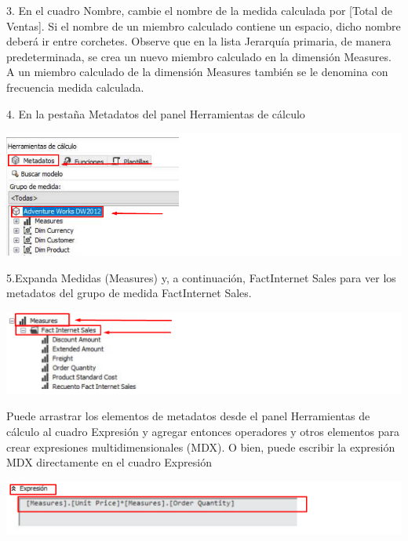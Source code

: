 3. En el cuadro Nombre, cambie el nombre de la medida calculada por [Total de Ventas].
Si el nombre de un miembro calculado contiene un espacio, dicho nombre deberá ir entre corchetes.
Observe que en la lista Jerarquía primaria, de manera predeterminada, se crea un nuevo miembro calculado en
la dimensión Measures. A un miembro calculado de la dimensión Measures también se le denomina con
frecuencia medida calculada.

4. En la pestaña Metadatos del panel Herramientas de cálculo

	\begin{center}
	\includegraphics[width=\columnwidth]{images/task7/img3}
	\end{center}	

5.Expanda Medidas (Measures) y, a continuación, FactInternet Sales para ver los metadatos del grupo de medida
FactInternet Sales.

	\begin{center}
	\includegraphics[width=\columnwidth]{images/task7/img4}
	\end{center}	

Puede arrastrar los elementos de metadatos desde el panel Herramientas de cálculo al cuadro Expresión y
agregar entonces operadores y otros elementos para crear expresiones multidimensionales (MDX). O bien, puede
escribir la expresión MDX directamente en el cuadro Expresión

	\begin{center}
	\includegraphics[width=\columnwidth]{images/task7/img5}
	\end{center}	

